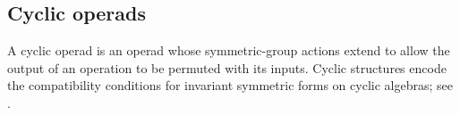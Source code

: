 \documentclass{amsart}
\newcommand{\BV}{\mathsf{BV}}
\theoremstyle{definition}
\newtheorem{example}[theorem]{Example}%
\numberwithin{equation}{section}
\begin{document}

\subsection{Cyclic operads}
\label{subsec: cyclic operads}

A cyclic operad is an operad whose symmetric-group actions extend
to allow the output of an operation to be permuted with its inputs.
Cyclic structures encode the compatibility conditions for invariant
symmetric forms on cyclic algebras; see
\cite[Section~4]{gk_cyc}.
\end{document}
